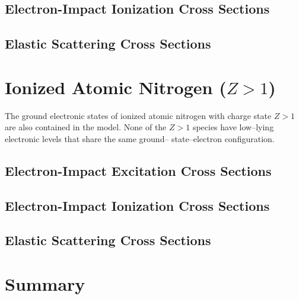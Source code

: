 \subsection{Electron-Impact Ionization Cross Sections} 
\tbd

\subsection{Elastic Scattering Cross Sections}
\tbd

\section{Ionized Atomic Nitrogen ($Z>1$)}
The ground electronic
states of ionized atomic nitrogen with charge state $Z>1$
are also contained in the model. None of the $Z>1$ species
have low–lying electronic levels that share the same ground–
state–electron configuration.

\subsection{Electron-Impact Excitation Cross Sections} 
\tbd

\subsection{Electron-Impact Ionization Cross Sections} 
\tbd

\subsection{Elastic Scattering Cross Sections}
\tbd


\section{Summary}

